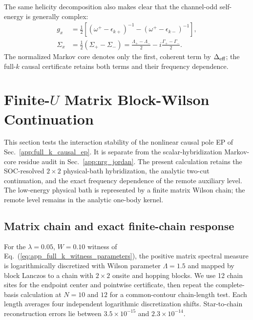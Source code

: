 \documentclass[%
  aps,prb,reprint,amsmath,amssymb,superscriptaddress,longbibliography,floatfix
]{revtex4-2}
\begin{document}
The same helicity decomposition also makes clear that the channel-odd
self-energy is generally complex:
\begin{equation}
\begin{aligned}
g_x&=\frac12\left[(\omega^+-\epsilon_{k+})^{-1}
-(\omega^+-\epsilon_{k-})^{-1}\right],\\
\Sigma_x&=\frac12(\Sigma_+-\Sigma_-)
=\frac{\Lambda_+-\Lambda_-}{2}
-i\frac{\Gamma_+-\Gamma_-}{2}.
\end{aligned}
\label{eq:app_complex_channel_odd_self_energy}
\end{equation}
The normalized Markov core denotes only the first, coherent term by
$\Delta_{\rm eff}$; the full-$k$ causal certificate retains both terms and
their frequency dependence.

\section{Finite-\texorpdfstring{$U$}{U} Matrix Block-Wilson Continuation}
\label{app:finiteU_fullk}

This section tests the interaction stability of the nonlinear causal pole EP
of Sec.~\ref{app:full_k_causal_ep}.  It is separate from the
scalar-hybridization Markov-core residue audit in
Sec.~\ref{app:nrg_jordan}.  The present calculation retains the
SOC-resolved \(2\times2\) physical-bath hybridization, the analytic two-cut
continuation, and the exact frequency dependence of the remote auxiliary
level.  The low-energy physical bath is represented by a finite matrix Wilson
chain; the remote level remains in the analytic one-body kernel.

\subsection{Matrix chain and exact finite-chain response}

For the \(\lambda=0.05\), \(W=0.10\) witness of
Eq.~(\ref{eq:app_full_k_witness_parameters}), the positive matrix spectral
measure is logarithmically discretized with Wilson parameter
\(\Lambda=1.5\) and mapped by block Lanczos to a chain with \(2\times2\)
onsite and hopping blocks.  We use 12 chain sites for the endpoint center and
pointwise certificate, then repeat the complete-basis calculation at $N=10$
and $12$ for a common-contour chain-length test.  Each length averages four
independent logarithmic discretization shifts.  Star-to-chain reconstruction errors lie
between \(3.5\times10^{-15}\) and \(2.3\times10^{-14}\).
\end{document}
